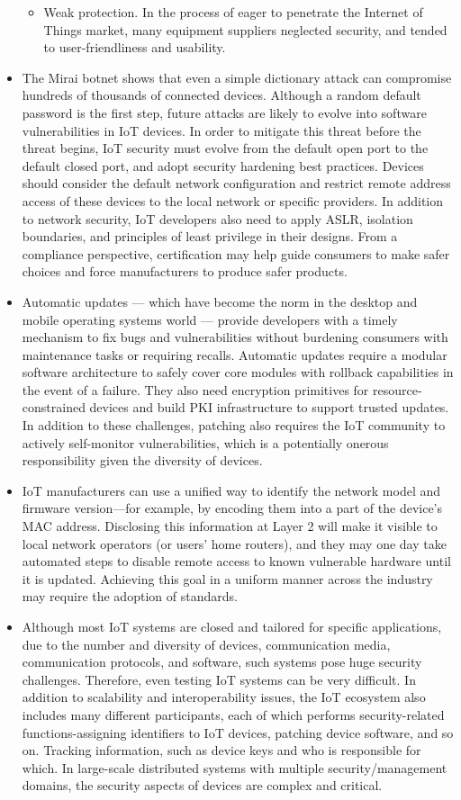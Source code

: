 \documentclass[conference]{IEEEtran}
\begin{document}
\begin{itemize}
\begin{itemize}
\item{Weak protection. In the process of eager to penetrate the Internet of Things market, many equipment suppliers neglected security, and tended to user-friendliness and usability.}
\end{itemize}
\item{The Mirai botnet shows that even a simple dictionary attack can compromise hundreds of thousands of connected devices. Although a random default password is the first step, future attacks are likely to evolve into software vulnerabilities in IoT devices. In order to mitigate this threat before the threat begins, IoT security must evolve from the default open port to the default closed port, and adopt security hardening best practices. Devices should consider the default network configuration and restrict remote address access of these devices to the local network or specific providers. In addition to network security, IoT developers also need to apply ASLR, isolation boundaries, and principles of least privilege in their designs. From a compliance perspective, certification may help guide consumers to make safer choices and force manufacturers to produce safer products.}
\item{Automatic updates — which have become the norm in the desktop and mobile operating systems world — provide developers with a timely mechanism to fix bugs and vulnerabilities without burdening consumers with maintenance tasks or requiring recalls. Automatic updates require a modular software architecture to safely cover core modules with rollback capabilities in the event of a failure. They also need encryption primitives for resource-constrained devices and build PKI infrastructure to support trusted updates. In addition to these challenges, patching also requires the IoT community to actively self-monitor vulnerabilities, which is a potentially onerous responsibility given the diversity of devices.}
\item{IoT manufacturers can use a unified way to identify the network model and firmware version—for example, by encoding them into a part of the device's MAC address. Disclosing this information at Layer 2 will make it visible to local network operators (or users’ home routers), and they may one day take automated steps to disable remote access to known vulnerable hardware until it is updated. Achieving this goal in a uniform manner across the industry may require the adoption of standards.}
\item{Although most IoT systems are closed and tailored for specific applications, due to the number and diversity of devices, communication media, communication protocols, and software, such systems pose huge security challenges. Therefore, even testing IoT systems can be very difficult. In addition to scalability and interoperability issues, the IoT ecosystem also includes many different participants, each of which performs security-related functions-assigning identifiers to IoT devices, patching device software, and so on. Tracking information, such as device keys and who is responsible for which. In large-scale distributed systems with multiple security/management domains, the security aspects of devices are complex and critical.}

\end{itemize}
\end{document}
